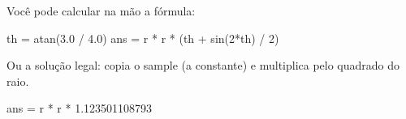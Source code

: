 Você pode calcular na mão a fórmula:

	th = atan(3.0 / 4.0)
	ans = r * r * (th + sin(2*th) / 2)

Ou a solução legal: copia o sample (a constante) e multiplica pelo quadrado do raio. 
	
	ans = r * r * 1.123501108793
